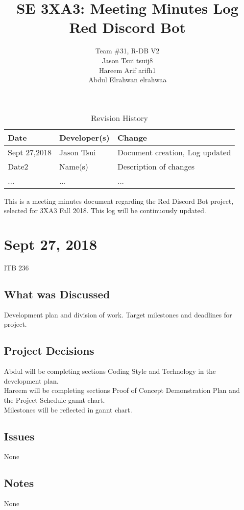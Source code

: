 \documentclass[12pt]{report}
\title{SE 3XA3: Meeting Minutes Log\\Red Discord Bot}
\author{Team \#31, R-DB V2
		\\ Jason Tsui tsuij8
		\\ Hareem Arif arifh1
		\\ Abdul Elrahwan elrahwaa
}
\date{}
\begin{document}
\begin{table}[hp]
\caption{Revision History} \label{TblRevisionHistory}
\begin{tabularx}{\textwidth}{llX}
\toprule
\textbf{Date} & \textbf{Developer(s)} & \textbf{Change}\\
\midrule
Sept 27,2018 & Jason Tsui & Document creation, Log updated\\
Date2 & Name(s) & Description of changes\\
... & ... & ...\\
\bottomrule
\end{tabularx}
\end{table}




\newpage

\maketitle
This is a meeting minutes document regarding the Red Discord Bot project, selected for 3XA3 Fall 2018. This log will be continuously updated.

\section{Sept 27, 2018}
ITB 236

\subsection{What was Discussed}
Development plan and division of work.
Target milestones and deadlines for project.

\subsection{Project Decisions}
Abdul will be completing sections Coding Style and Technology in the development plan.\\
Hareem will be completing sections Proof of Concept Demonstration Plan and the Project Schedule gannt chart.\\
Milestones will be reflected in gannt chart.

\subsection{Issues}
None

\subsection{Notes}
None
\end{document}

